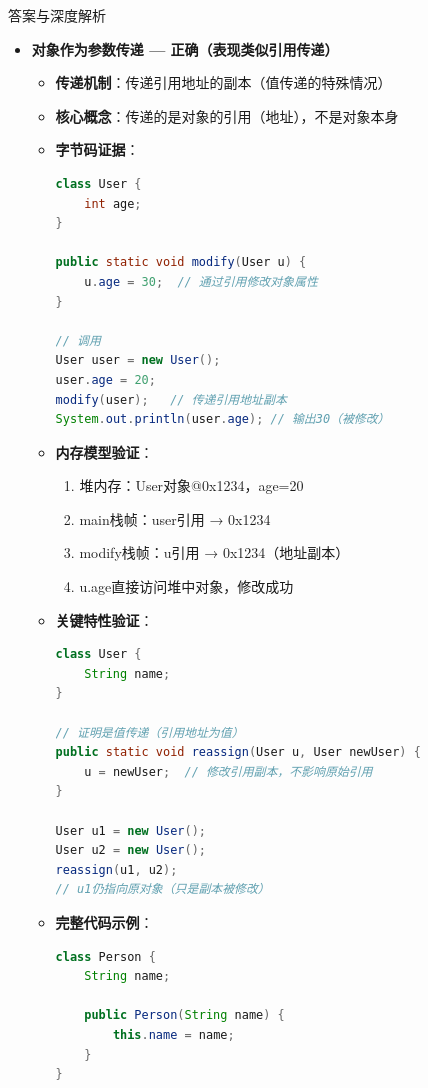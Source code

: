\documentclass[12pt, a4paper]{ctexart}
\begin{document}
\begin{enumerate}[label=\textbf{\arabic*.}]
\begin{bluebox}{答案与深度解析}
\begin{itemize}[leftmargin=*, nosep, label={}]
			      \item[B] \textbf{对象作为参数传递 — 正确（表现类似引用传递）}
			            \begin{itemize}[label={}, leftmargin=*, nosep]
				            \item \textbf{传递机制}：传递引用地址的副本（值传递的特殊情况）
				            \item \textbf{核心概念}：传递的是对象的引用（地址），不是对象本身
				            \item \textbf{字节码证据}：
				                  \begin{lstlisting}[language=Java]
class User {
    int age;
}

public static void modify(User u) {
    u.age = 30;  // 通过引用修改对象属性
}

// 调用
User user = new User();
user.age = 20;
modify(user);   // 传递引用地址副本
System.out.println(user.age); // 输出30（被修改）
				            \end{lstlisting}
				            \item \textbf{内存模型验证}：
				                  \begin{enumerate}[label={}, nosep]
					                  \item 堆内存：User对象@0x1234，age=20
					                  \item main栈帧：user引用 → 0x1234
					                  \item modify栈帧：u引用 → 0x1234（地址副本）
					                  \item u.age直接访问堆中对象，修改成功
				                  \end{enumerate}
				            \item \textbf{关键特性验证}：
				                  \begin{lstlisting}[language=Java]
class User {
    String name;
}

// 证明是值传递（引用地址为值）
public static void reassign(User u, User newUser) {
    u = newUser;  // 修改引用副本，不影响原始引用
}

User u1 = new User();
User u2 = new User();
reassign(u1, u2);
// u1仍指向原对象（只是副本被修改）
				            \end{lstlisting}
				            \item \textbf{完整代码示例}：
				                  \begin{lstlisting}[language=Java]
class Person {
    String name;

    public Person(String name) {
        this.name = name;
    }
}


\end{lstlisting}
\end{itemize}
\end{itemize}
\end{bluebox}
\end{enumerate}
\end{document}
